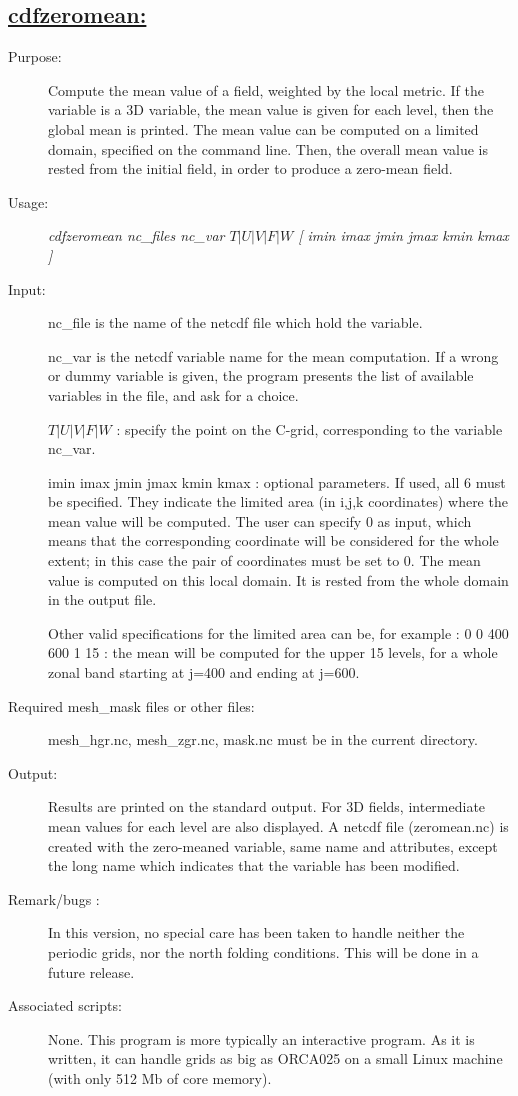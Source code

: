 \documentclass[a4paper,11pt]{article}
\begin{document}
\newpage

\newpage
\subsection*{\underline{cdfzeromean:}}
\begin{description}
\item[Purpose:] Compute the mean value of a field, weighted by the local metric. If the variable is a 3D variable,
the mean value is given for each level, then the global mean is printed. The mean value can be computed on a limited
domain, specified on the command line. Then, the overall mean value is rested from the initial field, in order to produce 
a zero-mean field.
\item[Usage:] {\em cdfzeromean nc\_files nc\_var  $T | U | V | F | W$ [ imin imax jmin jmax kmin kmax ] }
\item[Input:] nc\_file is the name of the netcdf file which hold the variable. 

nc\_var is the netcdf variable name for the mean computation. If a wrong or dummy variable is given, the program
presents the list of available variables in the file, and ask for a choice.

$ T | U | V | F | W $ : specify the point on the C-grid, corresponding to the variable nc\_var.

imin imax jmin jmax  kmin kmax : optional parameters. If used, all 6 must be specified. They indicate the limited
area (in i,j,k coordinates) where the mean value will be computed. The user can specify 0 as input, which means that
the corresponding coordinate will be considered for the whole extent; in this case the pair of coordinates must be set 
to 0.  The mean value is computed on this local domain. It is rested from the whole domain in the output file.

 Other valid specifications for the limited area 
can be, for example : 0 0  400 600 1 15 : the mean will be computed for the upper 15 levels, for a whole zonal band starting
at j=400 and ending at j=600.

\item[Required mesh\_mask files or other files:]   mesh\_hgr.nc, mesh\_zgr.nc, mask.nc must be in the current directory.
\item[Output:] Results are printed  on the standard output. For 3D fields, intermediate mean values for each level are also
displayed. A netcdf file (zeromean.nc) is created with the zero-meaned variable, same name and attributes, except the long name
which indicates that the variable has been modified.
\item[Remark/bugs :] In this version, no special care has been taken to handle neither the periodic grids, nor the north folding conditions.
This will be done in a future release.
\item[Associated scripts:] {None. This program is more typically an interactive program. As it is written, it can handle grids as big
as ORCA025 on a small Linux machine (with only 512 Mb of core memory).}
\end{description}
\end{document}

